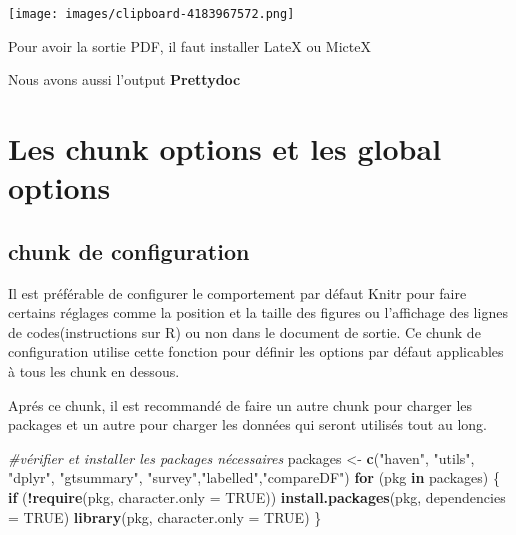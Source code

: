 \documentclass[
]{article}
\newenvironment{Shaded}{\begin{snugshade}}{\end{snugshade}}
\newcommand{\AttributeTok}[1]{\textcolor[rgb]{0.13,0.29,0.53}{#1}}
\newcommand{\CommentTok}[1]{\textcolor[rgb]{0.56,0.35,0.01}{\textit{#1}}}
\newcommand{\ConstantTok}[1]{\textcolor[rgb]{0.56,0.35,0.01}{#1}}
\newcommand{\ControlFlowTok}[1]{\textcolor[rgb]{0.13,0.29,0.53}{\textbf{#1}}}
\newcommand{\FunctionTok}[1]{\textcolor[rgb]{0.13,0.29,0.53}{\textbf{#1}}}
\newcommand{\NormalTok}[1]{#1}
\newcommand{\OtherTok}[1]{\textcolor[rgb]{0.56,0.35,0.01}{#1}}
\newcommand{\SpecialCharTok}[1]{\textcolor[rgb]{0.81,0.36,0.00}{\textbf{#1}}}
\newcommand{\StringTok}[1]{\textcolor[rgb]{0.31,0.60,0.02}{#1}}
\begin{document}
\texttt{[image: images/clipboard-4183967572.png]}

Pour avoir la sortie PDF, il faut installer LateX ou MicteX

Nous avons aussi l'output \textbf{Prettydoc}

\section{Les chunk options et les global
options}\label{les-chunk-options-et-les-global-options}

\subsection{chunk de configuration}\label{chunk-de-configuration}

Il est préférable de configurer le comportement par défaut Knitr pour
faire certains réglages comme la position et la taille des figures ou
l'affichage des lignes de codes(instructions sur R) ou non dans le
document de sortie. Ce chunk de configuration utilise cette fonction
pour définir les options par défaut applicables à tous les chunk en
dessous.

\begin{Shaded}
\end{Shaded}

Aprés ce chunk, il est recommandé de faire un autre chunk pour charger
les packages et un autre pour charger les données qui seront utilisés
tout au long.

\begin{Shaded}
\begin{Highlighting}[]
\CommentTok{\#vérifier et installer les packages nécessaires}
\NormalTok{packages }\OtherTok{\textless{}{-}} \FunctionTok{c}\NormalTok{(}\StringTok{"haven"}\NormalTok{, }\StringTok{"utils"}\NormalTok{, }\StringTok{"dplyr"}\NormalTok{, }\StringTok{"gtsummary"}\NormalTok{, }\StringTok{"survey"}\NormalTok{,}\StringTok{"labelled"}\NormalTok{,}\StringTok{"compareDF"}\NormalTok{)}
\ControlFlowTok{for}\NormalTok{ (pkg }\ControlFlowTok{in}\NormalTok{ packages) \{}
  \ControlFlowTok{if}\NormalTok{ (}\SpecialCharTok{!}\FunctionTok{require}\NormalTok{(pkg, }\AttributeTok{character.only =} \ConstantTok{TRUE}\NormalTok{)) }\FunctionTok{install.packages}\NormalTok{(pkg, }\AttributeTok{dependencies =} \ConstantTok{TRUE}\NormalTok{)}
  \FunctionTok{library}\NormalTok{(pkg, }\AttributeTok{character.only =} \ConstantTok{TRUE}\NormalTok{)}
\NormalTok{\}}
\end{Highlighting}
\end{Shaded}
\end{document}
